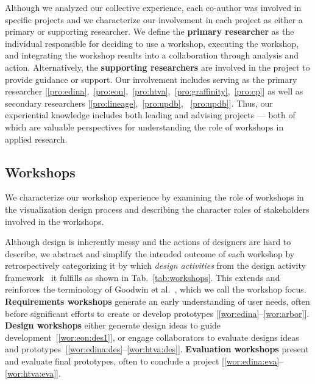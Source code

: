 Although we analyzed our collective experience, each co-author was involved in specific projects and we characterize our involvement in each project as either a primary or supporting researcher. We define the {\bf primary researcher} as the individual responsible for deciding to use a workshop, executing the workshop, and integrating the workshop results into a collaboration through analysis and action. Alternatively, the {\bf supporting researchers} are involved in the project to provide guidance or support. Our involvement includes serving as the primary researcher [\ref{pro:edina},~\ref{pro:eon},~\ref{pro:htva},~\ref{pro:graffinity},~\ref{pro:cp}] as well as secondary researchers [\ref{pro:lineage},~\ref{pro:updb},~ \ref{pro:updb}]. Thus, our experiential knowledge includes both leading and advising projects --- both of which are valuable perspectives for understanding the role of workshops in applied research. 

\subsection{Workshops}

We characterize our workshop experience by examining the role of workshops in the visualization design process and describing the character roles of stakeholders involved in the workshops.

Although design is inherently messy and the actions of designers are hard to describe, we abstract and simplify the intended outcome of each workshop by retrospectively  categorizing it by which \emph{design activities} from the design activity framework~\cite{McKenna2014} it fulfills as shown in Tab.~\ref{tab:workshops}. This extends and reinforces the terminology of Goodwin et al.~\cite{Goodwin2013}, which we call the workshop focus. {\bf Requirements workshops} generate an early understanding of user needs, often before significant efforts to create or develop prototypes [\ref{wor:edina}--\ref{wor:arbor}]. {\bf Design workshops} either generate design ideas to guide development~[\ref{wor:eon:des1}], or engage collaborators to evaluate designs ideas and prototypes~[\ref{wor:edina:des}--\ref{wor:htva:des}]. {\bf Evaluation workshops} present and evaluate final prototypes, often to conclude a project [\ref{wor:edina:eva}--\ref{wor:htva:eva}].

